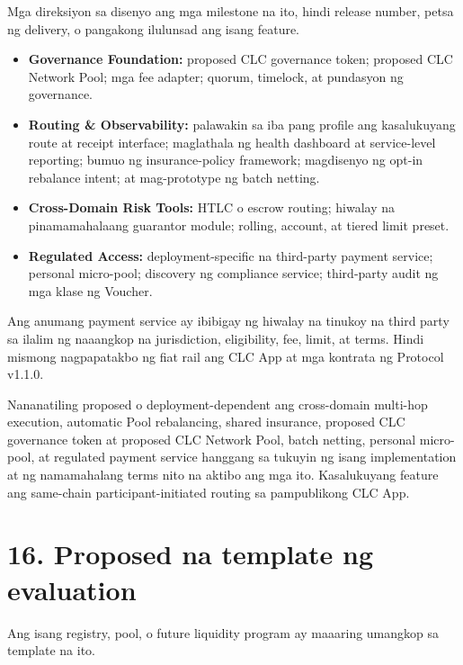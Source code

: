 \documentclass[11pt]{article}
\begin{document}
Mga direksiyon sa disenyo ang mga milestone na ito, hindi release number, petsa ng delivery, o pangakong ilulunsad ang isang feature.

\begin{itemize}[leftmargin=*]
\item \textbf{Governance Foundation:} proposed CLC governance token; proposed CLC Network Pool; mga fee adapter; quorum, timelock, at pundasyon ng governance.
\item \textbf{Routing \& Observability:} palawakin sa iba pang profile ang kasalukuyang route at receipt interface; maglathala ng health dashboard at service-level reporting; bumuo ng insurance-policy framework; magdisenyo ng opt-in rebalance intent; at mag-prototype ng batch netting.
\item \textbf{Cross-Domain Risk Tools:} HTLC o escrow routing; hiwalay na pinamamahalaang guarantor module; rolling, account, at tiered limit preset.
\item \textbf{Regulated Access:} deployment-specific na third-party payment service; personal micro-pool; discovery ng compliance service; third-party audit ng mga klase ng Voucher.
\end{itemize}
Ang anumang payment service ay ibibigay ng hiwalay na tinukoy na third party sa ilalim ng naaangkop na jurisdiction, eligibility, fee, limit, at terms. Hindi mismong nagpapatakbo ng fiat rail ang CLC App at mga kontrata ng Protocol v1.1.0.

Nananatiling proposed o deployment-dependent ang cross-domain multi-hop execution, automatic Pool rebalancing, shared insurance, proposed CLC governance token at proposed CLC Network Pool, batch netting, personal micro-pool, at regulated payment service hanggang sa tukuyin ng isang implementation at ng namamahalang terms nito na aktibo ang mga ito. Kasalukuyang feature ang same-chain participant-initiated routing sa pampublikong CLC App.


\section*{16. Proposed na template ng evaluation}

Ang isang registry, pool, o future liquidity program ay maaaring umangkop sa template na ito.
\end{document}
